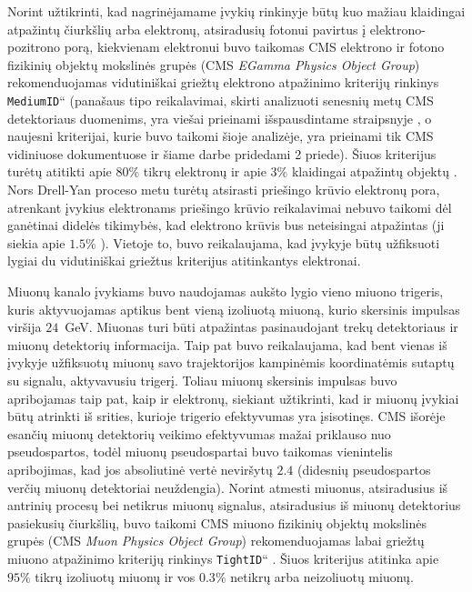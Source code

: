 \documentclass[a4paper, 12pt, oneside]{article}
\newcommand{\ttt}[1]{\texttt{#1}}
\newcommand{\ltq}[1]{{\quotedblbase{}#1\textquotedblleft{}}}
\newlength\q
\begin{document}
Norint užtikrinti, kad nagrinėjamame įvykių rinkinyje būtų kuo mažiau klaidingai atpažintų čiurkšlių arba elektronų,
atsiradusių fotonui pavirtus į elektrono-pozitrono porą, kiekvienam elektronui buvo taikomas CMS elektrono ir fotono
fizikinių objektų mokslinės grupės (CMS \textit{EGamma Physics Object Group}) rekomenduojamas vidutiniškai griežtų
elektrono atpažinimo kriterijų rinkinys \ltq{\ttt{MediumID}} (panašaus tipo reikalavimai, skirti analizuoti senesnių
metų CMS detektoriaus duomenims, yra viešai prieinami išspausdintame straipsnyje \cite{EleID}, o naujesni kriterijai,
kurie buvo taikomi šioje analizėje, yra prieinami tik CMS vidiniuose dokumentuose ir šiame darbe pridedami 2 priede).
Šiuos kriterijus turėtų atitikti apie $80\%$ tikrų elektronų ir apie $3\%$ klaidingai atpažintų objektų \cite{EleID}.
Nors Drell-Yan proceso metu turėtų atsirasti priešingo krūvio elektronų pora, atrenkant įvykius elektronams priešingo
krūvio reikalavimai nebuvo taikomi dėl ganėtinai didelės tikimybės, kad elektrono krūvis bus neteisingai atpažintas
(ji siekia apie $1.5\%$ \cite{EleID}).
Vietoje to, buvo reikalaujama, kad įvykyje būtų užfiksuoti lygiai du vidutiniškai griežtus kriterijus atitinkantys
elektronai.

Miuonų kanalo įvykiams buvo naudojamas aukšto lygio vieno miuono trigeris, kuris aktyvuojamas aptikus bent vieną izoliuotą
miuoną, kurio skersinis impulsas viršija $24$~GeV.
Miuonas turi būti atpažintas pasinaudojant trekų detektoriaus ir miuonų detektorių informacija.
Taip pat buvo reikalaujama, kad bent vienas iš įvykyje užfiksuotų miuonų savo trajektorijos kampinėmis koordinatėmis
sutaptų su signalu, aktyvavusiu trigerį.
Toliau miuonų skersinis impulsas buvo apribojamas taip pat, kaip ir elektronų, siekiant užtikrinti, kad ir miuonų įvykiai
būtų atrinkti iš srities, kurioje trigerio efektyvumas yra įsisotinęs.
CMS išorėje esančių miuonų detektorių veikimo efektyvumas mažai priklauso nuo pseudospartos, todėl miuonų pseudospartai
buvo taikomas vienintelis apribojimas, kad jos absoliutinė vertė neviršytų $2.4$ (didesnių pseudospartos verčių
miuonų detektoriai neuždengia).
Norint atmesti miuonus, atsiradusius iš antrinių procesų bei netikrus miuonų signalus, atsiradusius iš miuonų detektorius
pasiekusių čiurkšlių, buvo taikomi CMS miuono fizikinių objektų mokslinės grupės (CMS \textit{Muon Physics Object Group})
rekomenduojamas labai griežtų miuono atpažinimo kriterijų rinkinys \ltq{\ttt{TightID}} \cite{MuonID}.
Šiuos kriterijus atitinka apie $95\%$ tikrų izoliuotų miuonų ir vos $0.3\%$ netikrų arba neizoliuotų miuonų.
\end{document}
